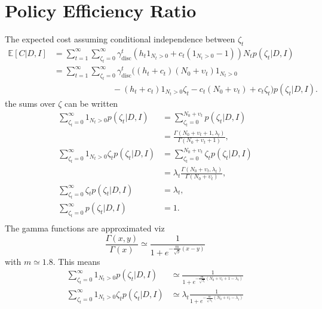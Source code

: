 \section{Policy Efficiency Ratio}
\label{app:cer}
The expected cost assuming conditional independence between $\zeta_t$
\begin{equation}
	\begin{split}
		\mathbb{E}[C|D,I] &= \sum_{t=1}^{\infty}\sum_{\zeta_t=0}^\infty \gamma_{\text{disc}}^{t} \left( h_t 1_{N_t> 0} + c_t (1_{N_t> 0}-1) \right)N_tp(\zeta_t| D, I)\\
		&= \sum_{t=1}^{\infty}\sum_{\zeta_t=0}^\infty \gamma_{\text{disc}}^{t} \bigg( 
		(h_t+c_t)(N_0 + \upsilon_t)1_{N_t> 0}\\
		&\qquad\qquad\qquad\quad-(h_t+c_t) 1_{N_t> 0}\zeta_t
		- c_t(N_0 + \upsilon_t)+c_t\zeta_t\bigg)p(\zeta_t| D, I).
	\end{split}
\end{equation}
the sums over $\zeta$ can be written
\begin{equation}
	\begin{split}
		\sum_{\zeta_t=0}^\infty1_{N_t> 0}p(\zeta_t| D, I) & = \sum_{\zeta_t=0}^{N_0+\upsilon_t} p(\zeta_t| D, I)\\
		&= \frac{\Gamma(N_0+\upsilon_t+1,\lambda_t)}{\Gamma(N_0+\upsilon_t+1)},\\
		\sum_{\zeta_t=0}^\infty1_{N_t> 0}\zeta_tp(\zeta_t| D, I) & = \sum_{\zeta_t=0}^{N_0+\upsilon_t} \zeta_t p(\zeta_t| D, I)\\
		& = \lambda_t \frac{\Gamma(N_0+\upsilon_t,\lambda_t)}{\Gamma(N_0+\upsilon_t)},\\
		\sum_{\zeta_t=0}^\infty\zeta_tp(\zeta_t| D, I) & = \lambda_t,\\
		\sum_{\zeta_t=0}^\infty p(\zeta_t| D, I) & = 1.\\
	\end{split}
\end{equation}
The gamma functions are approximated viz~\cite{bartmann1992inventory}
\begin{equation}
	\frac{\Gamma(x,y)}{\Gamma(x)}\simeq \frac{1}{1+e^{-\frac{m}{\sqrt{y}}(x-y)}}
\end{equation}
with $m\simeq 1.8$. This means
\begin{equation}
	\begin{split}
		\sum_{\zeta_t=0}^\infty1_{N_t> 0}p(\zeta_t| D, I) & \simeq \frac{1}{1+e^{-\frac{m}{\sqrt{\lambda_t}}(N_0+\upsilon_t+1-\lambda_t)}}\\
		\sum_{\zeta_t=0}^\infty1_{N_t> 0}\zeta_tp(\zeta_t| D, I) & \simeq \lambda_t\frac{1}{1+e^{-\frac{m}{\sqrt{\lambda_t}}(N_0+\upsilon_t-\lambda_t)}}\\
	\end{split}
\end{equation}
